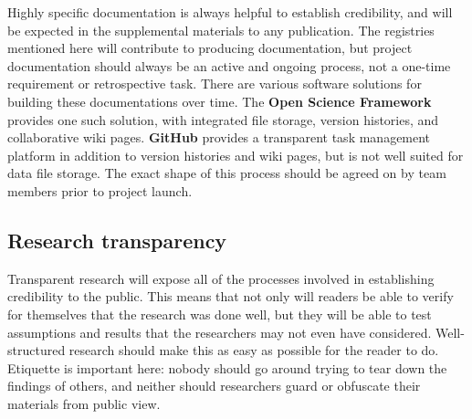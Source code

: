 Highly specific documentation is always helpful to establish credibility,
and will be expected in the supplemental materials to any publication.
The 
registries mentioned here will contribute to producing documentation,
but project documentation should always be an active and ongoing process,
not a one-time requirement or retrospective task.
There are various software solutions for building these documentations over time.
The \textbf{Open Science Framework} provides one such solution,
with integrated file storage, version histories, and collaborative wiki pages.
\textbf{GitHub} provides a transparent task management
platform
in addition to version histories and wiki pages, but is not well suited for data file storage.
The exact shape of this process should be agreed on by team members prior to project launch.

\subsection{Research transparency}

Transparent research will expose all of the processes involved in establishing credibility to the public.
This means that not only will readers be able to verify for themselves that the research was done well,
but they will be able to test assumptions and results that the researchers may not even have considered.
Well-structured research should make this as easy as possible for the reader to do.
Etiquette is 
important here: nobody should go around trying to tear down the findings of others,
and neither should researchers guard or obfuscate their materials from public view.

